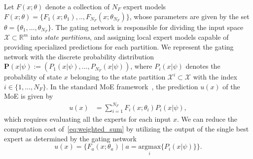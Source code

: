 Let $F(x; \theta)$ denote a collection of $N_F$ expert models $F(x;\theta) =
\{F_1(x; \theta_1), .. , F_{N_{F}}(x; \theta_{N_F})\}$, whose parameters
are given by the set $\theta=\{\theta_1, \dots, \theta_{N_{F}} \}$.
%
The gating network is responsible for dividing the input space $\mathcal{X}
\subset \mathbb{R}^m$ into \textit{state partitions}, and assigning local expert
models capable of providing specialized predictions for each partition.
%
%
We represent the gating network with the discrete probability distribution
$\mathbf{P}(x| \psi) := (P_1(x| \psi), \dots, P_{N_F}(x| \psi))$, where $P_i(x |
\psi)$ denotes the probability of state $x$ belonging to the state partition
$\mathcal{X}^i \subset \mathcal{X}$ with the index $i \in \{1, \dots, N_F \}$. 
%
%
%
In the standard MoE framework~\cite{jordan1994hierarchical}, the prediction
$u(x)$ of the MoE is given by
\begin{align}
  u(x) &= \sum_{i=1}^{N_F}F_i(x; \theta_i)P_i(x | \psi),
  \label{eq:weighted_sum}
\end{align}
%
which requires evaluating all the experts for each input $x$.
%
We can reduce the computation cost of~\eqref{eq:weighted_sum} by utilizing the
output of the single best expert as determined by the gating
network\cite{chen2022towards}
\begin{equation}
    u(x) = \{ F_a(x; \theta_a) \; | \; a = \underset{i}{\textrm{argmax}} \{ P_i(x | \psi) \} \}.
  \label{eq:best_expert_prediction}
\end{equation}
%

